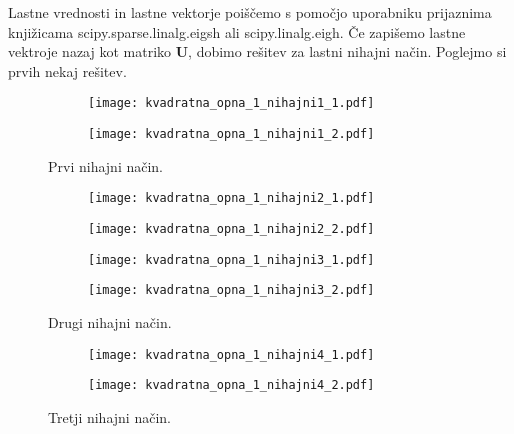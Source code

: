 \documentclass[12pt,a4paper]{article}
\begin{document}
Lastne vrednosti in lastne vektorje poiščemo s pomočjo uporabniku prijaznima knjižicama \textsf{scipy.sparse.linalg.eigsh} ali \textsf{scipy.linalg.eigh}. Če zapišemo lastne vektroje nazaj kot matriko \textbf{U}, dobimo rešitev za lastni nihajni način. Poglejmo si prvih nekaj rešitev.

\begin{figure}[H]
    \centering
    \begin{subfigure}[b]{0.49\textwidth}
        \texttt{[image: kvadratna\_opna\_1\_nihajni1\_1.pdf]}
    \end{subfigure}
    \begin{subfigure}[b]{0.49\textwidth}
        \texttt{[image: kvadratna\_opna\_1\_nihajni1\_2.pdf]}
    \end{subfigure}
    \caption{Prvi nihajni način.} \label{fig:slika2}
\end{figure}

\begin{figure}[H]
    \centering
    \begin{subfigure}[b]{0.49\textwidth}
        \texttt{[image: kvadratna\_opna\_1\_nihajni2\_1.pdf]}
    \end{subfigure}
    \begin{subfigure}[b]{0.49\textwidth}
        \texttt{[image: kvadratna\_opna\_1\_nihajni2\_2.pdf]}
    \end{subfigure}
    
        \begin{subfigure}[b]{0.49\textwidth}
        \texttt{[image: kvadratna\_opna\_1\_nihajni3\_1.pdf]}
    \end{subfigure}
    \begin{subfigure}[b]{0.49\textwidth}
        \texttt{[image: kvadratna\_opna\_1\_nihajni3\_2.pdf]}
    \end{subfigure}
    
    \caption{Drugi nihajni način.} \label{fig:slika3}
\end{figure}

\begin{figure}[H]
    \centering
    \begin{subfigure}[b]{0.49\textwidth}
        \texttt{[image: kvadratna\_opna\_1\_nihajni4\_1.pdf]}
    \end{subfigure}
    \begin{subfigure}[b]{0.49\textwidth}
        \texttt{[image: kvadratna\_opna\_1\_nihajni4\_2.pdf]}
    \end{subfigure}
    \caption{Tretji nihajni način.} \label{fig:slika4}
\end{figure}
\end{document}
